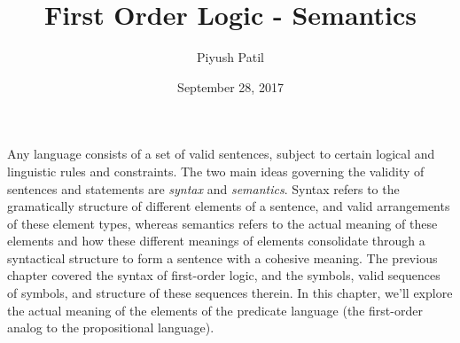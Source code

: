 \documentclass{article}
\begin{document}
\newcommand{\N}{\mathbb{N}}
\newcommand{\Z}{\mathbb{Z}}
\newcommand{\Q}{\mathbb{Q}}
\newcommand{\R}{\mathbb{R}}
\newcommand{\T}{\text{\normalfont\ T}}
\newcommand{\F}{\text{\normalfont\ F}}
\newcommand{\ti}{\textit}
\newcommand{\tb}{\textbf}
\newcommand{\n}{\leavevmode \newline}
\newcommand{\nn}{\leavevmode \newline \newline}
\def \Def#1#2{\begin{adjustwidth}{0.85cm}{0.85cm} \tb{(Definition) #1}: \ti{#2} \end{adjustwidth}}
\def \nDef#1#2{\n \Def{#1}{#2}}
\def \Defn#1#2{\Def{#1}{#2} \n}
\def \nDefn#1#2{\n \Defn{#1}{#2}}
\def \Defcont#1{\begin{adjustwidth}{0.85cm}{0.85cm} \ti{#1} \end{adjustwidth} \n}
\def \InDef#1{\ti{\begin{adjustwidth}{0.85cm}{0.85cm} #1 \end{adjustwidth}}}
\def \Thm#1#2{\begin{adjustwidth}{0.85cm}{0.85cm} \tb{(Theorem) #1}: \ti{#2} \end{adjustwidth}}
\def \nThm#1#2{\n \Thm{#1}{#2}}
\def \Thmn#1#2{\Thm{#1}{#2} \n}
\def \nThmn#1#2{\n \Thmn{#1}{#2}}
\def \InThm#1{\ti{\begin{adjustwidth}{0.85cm}{0.85cm} #1 \end{adjustwidth}}}
\def \Pf#1{\begin{adjustwidth}{0.85cm}{0.85cm} \textit{Proof}: #1 \qedsymbol \end{adjustwidth} \n}
\newcommand{\st}{\textnormal{ s.t. }}
\newcommand{\proplang}{\mathcal{L}_0}
\newcommand{\predlang}{\mathcal{L}}

\title{First Order Logic - Semantics}
\author{Piyush Patil}
\date{September 28, 2017}
\maketitle

Any language consists of a set of valid sentences, subject to certain logical and linguistic rules and constraints. The two main ideas governing the validity of sentences and statements are \ti{syntax} and \ti{semantics}. Syntax refers to the gramatically structure of different elements of a sentence, and valid arrangements of these element types, whereas semantics refers to the actual meaning of these elements and how these different meanings of elements consolidate through a syntactical structure to form a sentence with a cohesive meaning. The previous chapter covered the syntax of first-order logic, and the symbols, valid sequences of symbols, and structure of these sequences therein. In this chapter, we'll explore the actual meaning of the elements of the predicate language (the first-order analog to the propositional language).
\end{document}
